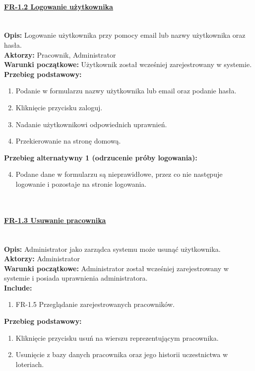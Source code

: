\paragraph{\underline{FR-1.2 Logowanie użytkownika}}\mbox{}\\[1mm]
	\noindent\textbf{Opis:} Logowanie użytkownika przy pomocy email lub nazwy użytkownika oraz hasła.\\
	\noindent\textbf{Aktorzy:} Pracownik, Administrator\\
	\textbf{Warunki początkowe:} Użytkownik został wcześniej zarejestrowany w systemie.\\
	\textbf{Przebieg podstawowy:}
	\begin{enumerate}[noparskip]
		\item Podanie w formularzu nazwy użytkownika lub email oraz podanie hasła.
    \item Kliknięcie przycisku zaloguj.
		\item Nadanie użytkownikowi odpowiednich uprawnień.
		\item Przekierowanie na stronę domową.
	\end{enumerate} 
	\indent \textbf{Przebieg alternatywny 1 (odrzucenie próby logowania):}
	\begin{enumerate}[noparskip]\setcounter{enumi}{3}
		\item Podane dane w formularzu są nieprawidłowe, przez co nie następuje logowanie i pozostaje na stronie logowania.
	\end{enumerate}	\mbox{}\\[-11mm]

\paragraph{\underline{FR-1.3 Usuwanie pracownika}}\mbox{}\\[1mm]
	\noindent\textbf{Opis:}	Administrator jako zarządca systemu może usunąć użytkownika.\\
	\noindent\textbf{Aktorzy:} Administrator\\
	\textbf{Warunki początkowe:} Administrator został wcześniej zarejestrowany w systemie i posiada uprawnienia administratora.\\
	\textbf{Include:} 
	\begin{enumerate}[noparskip]
		\item FR-1.5 Przeglądanie zarejestrowanych pracowników.
	\end{enumerate}
  \textbf{Przebieg podstawowy:}
	\begin{enumerate}[noparskip]
		\item Kliknięcie przycisku usuń na wierszu reprezentującym pracownika.
    \item Usunięcie z bazy danych pracownika oraz jego historii uczestnictwa w loteriach.
	\end{enumerate} \mbox{}\\[-11mm]

